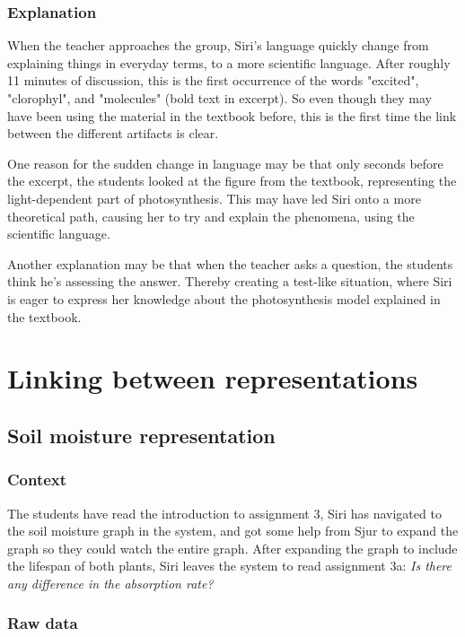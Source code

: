 \subsubsection*{Explanation}
When the teacher approaches the group, Siri's language quickly change from explaining things in everyday terms, to a more scientific language. After roughly 11 minutes of discussion, this is the first occurrence of the words "excited", "clorophyl", and "molecules" (bold text in excerpt). So even though they may have been using the material in the textbook before, this is the first time the link between the different artifacts is clear. 

One reason for the sudden change in language may be that only seconds before the excerpt, the students looked at the figure from the textbook, representing the light-dependent part of photosynthesis. This may have led Siri onto a more theoretical path, causing her to try and explain the phenomena, using the scientific language. 

Another explanation may be that when the teacher asks a question, the students think he's assessing the answer. Thereby creating a test-like situation, where Siri is eager to express her knowledge about the photosynthesis model explained in the textbook. 


\section{Linking between representations}
\subsection{Soil moisture representation}


\subsubsection*{Context}
The students have read the introduction to assignment 3, Siri has navigated to the soil moisture graph in the system, and got some help from Sjur to expand the graph so they could watch the entire graph. After expanding the graph to include the lifespan of both plants, Siri leaves the system to read assignment 3a: \emph{Is there any difference in the absorption rate?}



\subsubsection*{Raw data}

